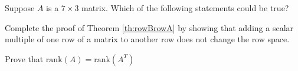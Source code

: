 \documentclass{ximera}
\begin{document}
\begin{problem}\label{prob:truefalse7by3}
Suppose $A$ is a $7\times 3$ matrix.  Which of the following statements could be true?
\begin{selectAll}
 \end{selectAll}
\end{problem}

\begin{problem}\label{prob:proofofrowBrowA}
Complete the proof of Theorem \ref{th:rowBrowA} by showing that adding a scalar multiple of one row of a matrix to another row does not change the row space.
\end{problem}

\begin{problem}\label{prob:rankoftranspose}
Prove that $\mbox{rank}(A)=\mbox{rank}(A^T)$
\end{problem}
\end{document}
